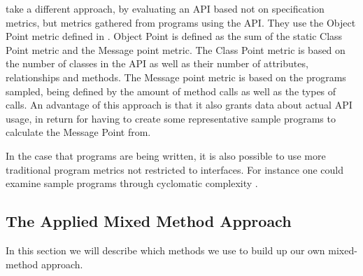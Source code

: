 \citet{alatalo2013comparative} take a different approach, by evaluating an \gls{API} based not on specification metrics, but metrics gathered from programs using the \gls{API}.
They use the Object Point metric defined in \citet{sneed1995estimating}.
Object Point is defined as the sum of the static Class Point metric and the Message point metric.
The Class Point metric is based on the number of classes in the \gls{API} as well as their number of attributes, relationships and methods.
The Message point metric is based on the programs sampled, being defined by the amount of method calls as well as the types of calls.
An advantage of this approach is that it also grants data about actual \gls{API} usage, in return for having to create some representative sample programs to calculate the Message Point from.

In the case that programs are being written, it is also possible to use more traditional program metrics not restricted to interfaces.
For instance one could examine sample programs through cyclomatic complexity \cite{mccabe1976complexity}.

\subsection{The Applied Mixed Method Approach}
In this section we will describe which methods we use to build up our own mixed-method approach.
